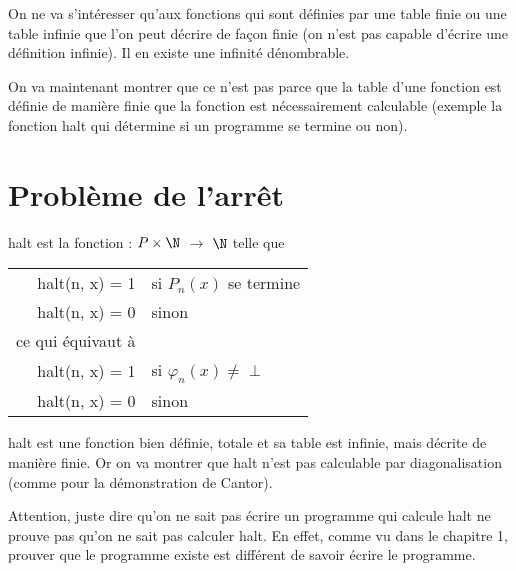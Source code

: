 On ne va s'intéresser qu'aux fonctions qui sont définies par une table finie ou une table infinie que l'on peut décrire de façon finie (on n'est pas capable d'écrire une définition infinie). Il en existe une infinité dénombrable.

On va maintenant montrer que ce n'est pas parce que la table d'une fonction est définie de manière finie que la fonction est nécessairement calculable (exemple la fonction halt qui détermine si un programme se termine ou non).


\section{Problème de l'arrêt}
\label{sec:probl_me_de_l_arr_t}

\begin{mydef}[halt]
	halt est la fonction : $P \times \N$ $\rightarrow$ $\N$ telle que \\
	\begin{tabular}{rl}
	  halt(n, x) = 1 & si $P_n(x)$ se termine \\
	  halt(n, x) = 0 & sinon \\
	  ce qui équivaut à &\\
	  halt(n, x) = 1 & si $\varphi_n(x)\neq \perp$ \\
	  halt(n, x) = 0 & sinon \\
	\end{tabular}
\end{mydef}

\begin{myprop}
	halt est une fonction bien définie, totale et sa table est infinie, mais décrite de manière finie. Or on va montrer que halt n'est pas calculable par diagonalisation (comme pour la démonstration de Cantor).\\
\end{myprop}

\begin{myrem}
	Attention, juste dire qu'on ne sait pas écrire un programme qui calcule halt ne prouve pas qu'on ne sait pas calculer halt. En effet, comme vu dans le chapitre 1, prouver que le programme existe est différent de savoir écrire le programme.
\end{myrem}

